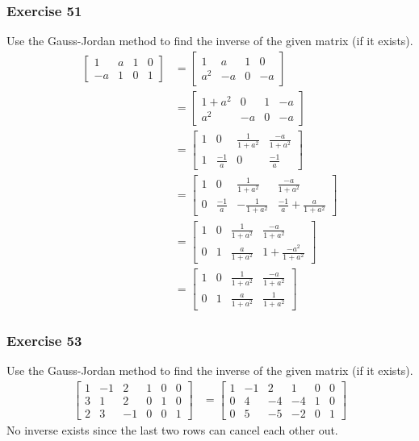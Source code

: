 \documentclass[letterpaper, 12pt]{math}
\begin{document}
\subsubsection*{Exercise 51}
Use the Gauss-Jordan method to find the inverse of the given matrix (if it
exists).
\begin{align*}
  \begin{bmatrix}
    1 & a & 1 & 0 \\
    -a & 1 & 0 & 1
  \end{bmatrix} &= \begin{bmatrix}
    1 & a & 1 & 0 \\
    a^2 & -a & 0 & -a
  \end{bmatrix} \\
  &= \begin{bmatrix}
    1+a^2 & 0 & 1 & -a \\
    a^2 & -a & 0 & -a
  \end{bmatrix} \\
  &= \begin{bmatrix}
    1 & 0 & \frac{1}{1+a^2} & \frac{-a}{1+a^2} \\[0.25em]
    1 & \frac{-1}{a} & 0 & \frac{-1}{a}
  \end{bmatrix} \\
  &= \begin{bmatrix}
    1 & 0 & \frac{1}{1+a^2} & \frac{-a}{1+a^2} \\[0.25em]
    0 & \frac{-1}{a} & -\frac{1}{1+a^2} & \frac{-1}{a}+\frac{a}{1+a^2}
  \end{bmatrix} \\
  &= \begin{bmatrix}
    1 & 0 & \frac{1}{1+a^2} & \frac{-a}{1+a^2} \\[0.25em]
    0 & 1 & \frac{a}{1+a^2} & 1+\frac{-a^2}{1+a^2}
  \end{bmatrix} \\
  &= \begin{bmatrix}
    1 & 0 & \frac{1}{1+a^2} & \frac{-a}{1+a^2} \\[0.25em]
    0 & 1 & \frac{a}{1+a^2} & \frac{1}{1+a^2}
  \end{bmatrix}
\end{align*}

\subsubsection*{Exercise 53}
Use the Gauss-Jordan method to find the inverse of the given matrix (if it
exists).
\begin{align*}
  \begin{bmatrix}
    1 & -1 & 2 & 1 & 0 & 0 \\
    3 & 1 & 2 & 0 & 1 & 0 \\
    2 & 3 & -1 & 0 & 0 & 1
  \end{bmatrix} &= \begin{bmatrix}
    1 & -1 & 2 & 1 & 0 & 0 \\
    0 & 4 & -4 & -4 & 1 & 0 \\
    0 & 5 & -5 & -2 & 0 & 1
  \end{bmatrix}
\end{align*}
No inverse exists since the last two rows can cancel each other out.
\end{document}
